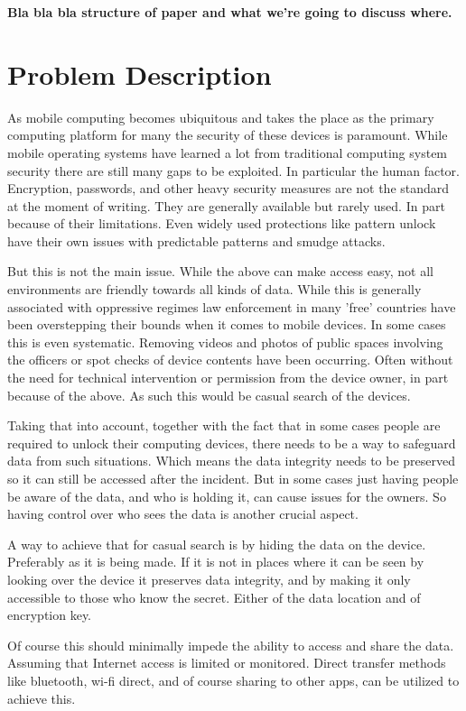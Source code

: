 \documentclass[twocolumn,english,compsoc,journal]{IEEEtran}
\begin{document}
\textbf{Bla bla bla structure of paper and what we're going to discuss
where.}


\section{Problem Description}

As mobile computing becomes ubiquitous and takes the place as the primary
computing platform for many the security of these devices is paramount.
While mobile operating systems have learned a lot from traditional computing
system security there are still many gaps to be exploited. In particular the
human factor. Encryption, passwords, and other heavy security measures are 
not the standard at the moment of writing. They are generally available but
rarely used. In part because of their limitations. Even widely used protections
like pattern unlock have their own issues with predictable patterns and smudge
attacks.

But this is not the main issue. While the above can make access easy, not all
environments are friendly towards all kinds of data. While this is generally
associated with oppressive regimes law enforcement in many 'free' countries
have been overstepping their bounds when it comes to mobile devices. In
some cases this is even systematic. Removing videos and photos of public 
spaces involving the officers or spot checks of device contents have been
occurring. Often without the need for technical intervention or permission
from the device owner, in part because of the above. As such this would be
casual search of the devices.

Taking that into account, together with the fact that in some cases people
are required to unlock their computing devices, there needs to be a way to
safeguard data from such situations. Which means the data integrity needs
to be preserved so it can still be accessed after the incident. But in some
cases just having people be aware of the data, and who is holding it, can
cause issues for the owners. So having control over who sees the data is
another crucial aspect.

A way to achieve that for casual search is by hiding the data on the device.
Preferably as it is being made. If it is not in places where it can be seen
by looking over the device it preserves data integrity, and by making it
only accessible to those who know the secret. Either of the data location
and of encryption key.

Of course this should minimally impede the ability to access and share the
data. Assuming that Internet access is limited or monitored. Direct transfer
methods like bluetooth, wi-fi direct, and of course sharing to other apps,
can be utilized to achieve this.
\end{document}
